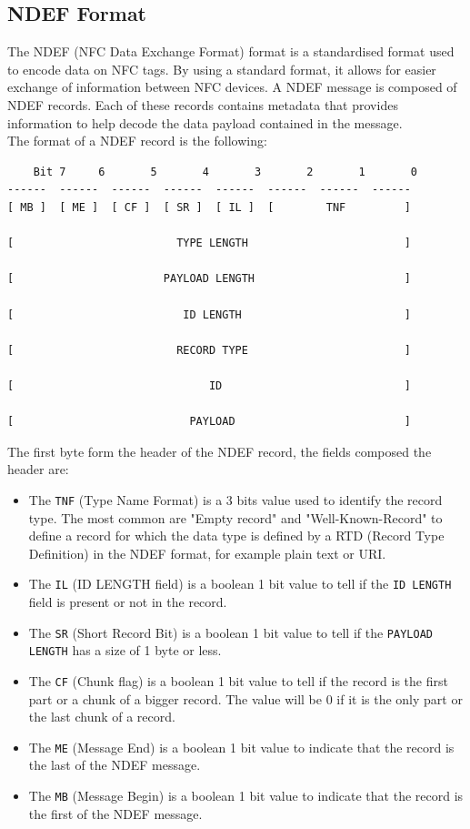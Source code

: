 \documentclass[11pt,a4paper]{report}
\begin{document}
\subsection{NDEF Format}
The NDEF (NFC Data Exchange Format) format is a standardised format used to encode data on NFC tags. By using a standard format, it allows for easier exchange of information between NFC devices. A NDEF message is composed of NDEF records. Each of these records contains metadata that provides information to help decode the data payload contained in the message.\\

The format of a NDEF record is the following\cite{nfc:ndef:adafruit:article}:
\begin{verbatim}
	Bit 7     6       5       4       3       2       1       0
------  ------  ------  ------  ------  ------  ------  ------ 
[ MB ]  [ ME ]  [ CF ]  [ SR ]  [ IL ]  [        TNF         ]  

[                         TYPE LENGTH                        ]

[                       PAYLOAD LENGTH                       ]

[                          ID LENGTH                         ]

[                         RECORD TYPE                        ]

[                              ID                            ]

[                           PAYLOAD                          ]
\end{verbatim}
The first byte form the header of the NDEF record, the fields composed the header are:
\begin{itemize}
	\item The \verb+TNF+ (Type Name Format) is a 3 bits value used to identify the record type. The most common are "Empty record" and "Well-Known-Record" to define a record for which the data type is defined by a RTD (Record Type Definition) in the NDEF format, for example plain text or URI.
	\item The \verb+IL+ (ID LENGTH field) is a boolean 1 bit value to tell if the \verb+ID LENGTH+ field is present or not in the record.
	\item The \verb+SR+ (Short Record Bit) is a boolean 1 bit value to tell if the \verb+PAYLOAD LENGTH+ has a size of 1 byte or less.
	\item The \verb+CF+ (Chunk flag) is a boolean 1 bit value to tell if the record is the first part or a chunk of a bigger record. The value will be 0 if it is the only part or the last chunk of a record.
	\item The \verb+ME+ (Message End) is a boolean 1 bit value to indicate that the record is the last of the NDEF message.
	\item The \verb+MB+ (Message Begin) is a boolean 1 bit value to indicate that the record is the first of the NDEF message.
\end{itemize}
\end{document}
